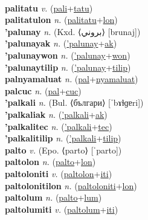 \label{paliki} \\
\textbf{palitatu} \textit{v.} (\hyperref[pali]{pali}+\hyperref[tatu]{tatu})
 \label{palitatu} \\
\textbf{palitatulon} \textit{n.} (\hyperref[palitatu]{palitatu}+\hyperref[lon]{lon})
 \label{palitatulon} \\
\textbf{'palunay} \textit{n.} (Kxd. ⟨بروني⟩ [brunaj])
 \label{'palunay} \\
\textbf{'palunayak} \textit{n.} (\hyperref['palunay]{'palunay}+\hyperref[ak]{ak})
 \label{'palunayak} \\
\textbf{'palunaywon} \textit{n.} (\hyperref['palunay]{'palunay}+\hyperref[won]{won})
 \label{'palunaywon} \\
\textbf{'palunaytilip} \textit{n.} (\hyperref['palunay]{'palunay}+\hyperref[tilip]{tilip})
 \label{'palunaytilip} \\
\textbf{palnyamaluat} \textit{n.} (\hyperref[pal]{pal}+\hyperref[nyamaluat]{nyamaluat})
 \label{palnyamaluat} \\
\textbf{palcuc} \textit{n.} (\hyperref[pal]{pal}+\hyperref[cuc]{cuc})
 \label{palcuc} \\
\textbf{'palkali} \textit{n.} (Bul. ⟨българи⟩ [ˈbɤɫɡɐri])
 \label{'palkali} \\
\textbf{'palkaliak} \textit{n.} (\hyperref['palkali]{'palkali}+\hyperref[ak]{ak})
 \label{'palkaliak} \\
\textbf{'palkalitec} \textit{n.} (\hyperref['palkali]{'palkali}+\hyperref[tec]{tec})
 \label{'palkalitec} \\
\textbf{'palkalitilip} \textit{n.} (\hyperref['palkali]{'palkali}+\hyperref[tilip]{tilip})
 \label{'palkalitilip} \\
\textbf{palto} \textit{v.} (Epo. ⟨parto⟩ [ˈparto])
 \label{palto} \\
\textbf{paltolon} \textit{n.} (\hyperref[palto]{palto}+\hyperref[lon]{lon})
 \label{paltolon} \\
\textbf{paltoloniti} \textit{v.} (\hyperref[paltolon]{paltolon}+\hyperref[iti]{iti})
 \label{paltoloniti} \\
\textbf{paltolonitilon} \textit{n.} (\hyperref[paltoloniti]{paltoloniti}+\hyperref[lon]{lon})
 \label{paltolonitilon} \\
\textbf{paltolum} \textit{n.} (\hyperref[palto]{palto}+\hyperref[lum]{lum})
 \label{paltolum} \\
\textbf{paltolumiti} \textit{v.} (\hyperref[paltolum]{paltolum}+\hyperref[iti]{iti})
 \label{paltolumiti} \\
